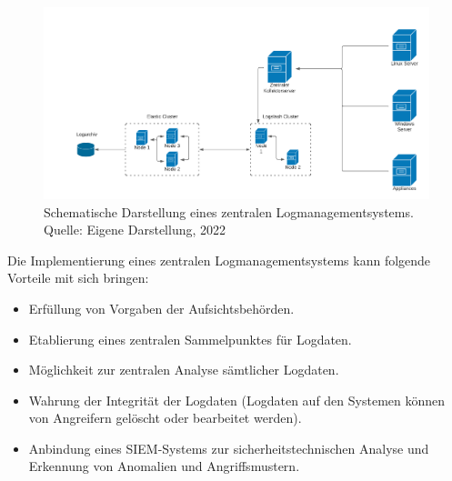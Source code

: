 \begin{figure}[H]
    \centering
  \includegraphics[scale=0.2]{images/uploads/a_figure_10.png}
  \caption{Schematische Darstellung eines zentralen Logmanagementsystems. Quelle: Eigene Darstellung, 2022}
  \label{fig:best-practice logmanagement}
\end{figure}
\bigbreak
Die Implementierung eines zentralen Logmanagementsystems kann folgende Vorteile mit sich bringen:
\begin{itemize}
    \item Erfüllung von Vorgaben der Aufsichtsbehörden.
    \item Etablierung eines zentralen Sammelpunktes für Logdaten.
    \item Möglichkeit zur zentralen Analyse sämtlicher Logdaten.
    \item Wahrung der Integrität der Logdaten (Logdaten auf den Systemen können von Angreifern gelöscht oder bearbeitet werden).
    \item Anbindung eines SIEM-Systems zur sicherheitstechnischen Analyse und Erkennung von Anomalien und Angriffsmustern.
\end{itemize}


